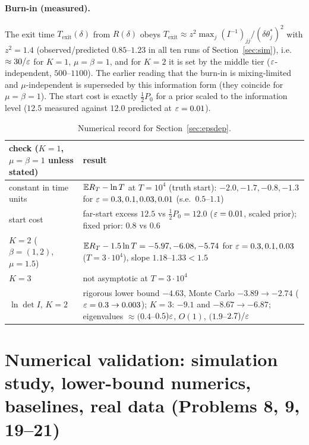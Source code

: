 \paragraph{Burn-in (measured).} The exit time $T_{\mathrm{exit}}(\delta)$ from $R(\delta)$ obeys $T_{\mathrm{exit}}\approx z^2\max_j(I^{-1})_{jj}/(\delta\theta^*_j)^2$ with $z^2=1.4$ (observed/predicted $0.85$--$1.23$ in all ten runs of Section~\ref{sec:sim}), i.e. $\approx30/\varepsilon$ for $K=1$, $\mu=\beta=1$, and for $K=2$ it is set by the middle tier ($\varepsilon$-independent, $500$--$1100$). The earlier reading that the burn-in is mixing-limited and $\mu$-independent is superseded by this information form (they coincide for $\mu=\beta=1$). The start cost is exactly $\tfrac12P_0$ for a prior scaled to the information level ($12.5$ measured against $12.0$ predicted at $\varepsilon=0.01$).

\begin{table}[h]\centering\small
\begin{tabular}{@{}p{4.4cm}p{9cm}@{}}\toprule
check ($K=1$, $\mu=\beta=1$ unless stated) & result\\\midrule
constant in time units & $\mathbb{E} R_T-\ln T$ at $T=10^4$ (truth start): $-2.0,-1.7,-0.8,-1.3$ for $\varepsilon=0.3,0.1,0.03,0.01$ (s.e.\ $0.5$--$1.1$)\\
start cost & far-start excess $12.5$ vs $\tfrac12P_0=12.0$ ($\varepsilon=0.01$, scaled prior); fixed prior: $0.8$ vs $0.6$\\
$K=2$ ($\beta=(1,2)$, $\mu=1.5$) & $\mathbb{E} R_T-1.5\ln T=-5.97,-6.08,-5.74$ for $\varepsilon=0.3,0.1,0.03$ ($T=3\cdot10^4$), slope $1.18$--$1.33<1.5$\\
$K=3$ & not asymptotic at $T=3\cdot10^4$\\
$\ln\det I$, $K=2$ & rigorous lower bound $-4.63$, Monte Carlo $-3.89\to-2.74$ ($\varepsilon=0.3\to0.003$); $K=3$: $-9.1$ and $-8.67\to-6.87$; eigenvalues $\approx(0.4$--$0.5)\varepsilon$, $O(1)$, $(1.9$--$2.7)/\varepsilon$\\\bottomrule
\end{tabular}
\caption{Numerical record for Section~\ref{sec:epsdep}.}\label{tab:epsnum}
\end{table}

\section{Numerical validation: simulation study, lower-bound numerics, baselines, real data (Problems 8, 9, 19--21)}\label{sec:validation}

